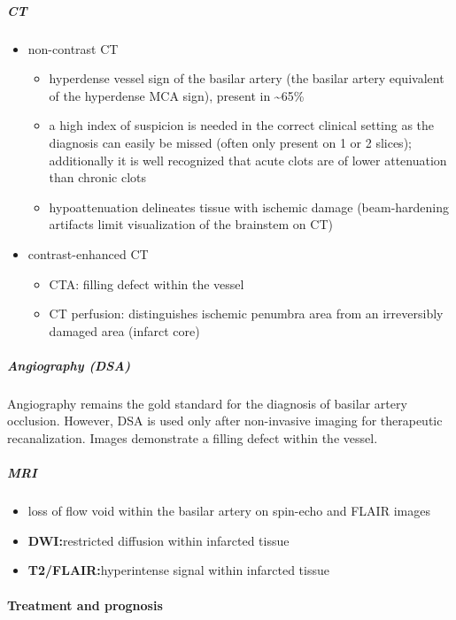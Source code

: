 \subparagraph{CT}

\begin{itemize}
	\item
	non-contrast CT
	
	\begin{itemize}
		\item
		hyperdense vessel sign of the basilar artery (the basilar artery equivalent of the hyperdense MCA sign), present in \textasciitilde65\% 
		\item
		a high index of suspicion is needed in the correct clinical setting as the diagnosis can easily be missed (often only present on 1 or 2 slices); additionally it is well recognized that acute clots are of lower attenuation than chronic clots 
		\item
		hypoattenuation delineates tissue with ischemic damage (beam-hardening artifacts limit visualization of the brainstem on CT)
	\end{itemize}
	\item
	contrast-enhanced CT
	
	\begin{itemize}
		\item
		CTA: filling defect within the vessel
		\item
		CT perfusion: distinguishes ischemic penumbra area from an irreversibly damaged area (infarct core)
	\end{itemize}
\end{itemize}

\subparagraph{Angiography (DSA)}

Angiography remains the gold standard for the diagnosis of basilar artery occlusion. However, DSA is used only after non-invasive imaging for therapeutic recanalization. Images demonstrate a filling defect within the vessel.

\subparagraph{MRI}

\begin{itemize}
	\item
	loss of flow void within the basilar artery on spin-echo and FLAIR images
	\item
	\textbf{DWI:}restricted diffusion within infarcted tissue
	\item
	\textbf{T2/FLAIR:}hyperintense signal within infarcted tissue
\end{itemize}

\paragraph{Treatment and prognosis}

